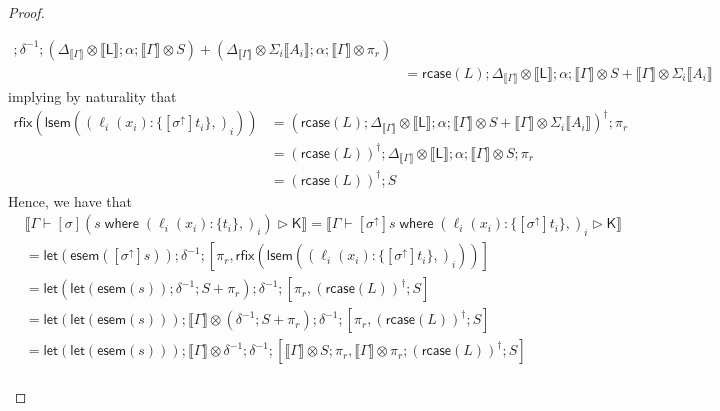 \documentclass[acmsmall,screen,review]{acmart}
\newcommand{\ms}[1]{\ensuremath{\mathsf{#1}}}
\newcommand{\lto}{:}
\newcommand{\where}[2]{#1\;\ms{where}\;#2}
\newcommand{\wbranch}[3]{#1(#2) \lto \{#3\}}
\newcommand{\upg}[1]{{#1}^\uparrow}
\newcommand{\haslb}[3]{#1 \vdash #2 \rhd #3}
\newcommand{\dnt}[1]{\llbracket{#1}\rrbracket}
\newcommand{\dmor}[1]{{\Delta}_{#1}}
\newcommand{\entrymor}[1]{\ms{esem}(#1)}
\newcommand{\loopmor}[1]{\ms{lsem}(#1)}
\newcommand{\lmor}[1]{\ms{let}(#1)}
\newcommand{\rcase}[1]{\ms{rcase}(#1)}
\newcommand{\rfix}[1]{\ms{rfix}(#1)}
\begin{document}
\begin{proof}
\begin{itemize}[leftmargin=*]
\begin{equation}
\begin{aligned}
          ; \delta^{-1}
          ; (\dmor{\dnt{\Gamma}} \otimes \dnt{\ms{L}} ; \alpha ; \dnt{\Gamma} \otimes S) 
          + (\dmor{\dnt{\Gamma}} \otimes \Sigma_i\dnt{A_i}
              ; \alpha ; \dnt{\Gamma} \otimes \pi_r) \\
          & = \rcase{L}
            ; \dmor{\dnt{\Gamma}} \otimes \dnt{\ms{L}} ; \alpha ; \dnt{\Gamma} \otimes S
            + \dnt{\Gamma} \otimes \Sigma_i\dnt{A_i}
      \end{aligned}
    \end{equation}
    implying by naturality that
    \begin{equation}
      \begin{aligned}
        \rfix{\loopmor{(\wbranch{\ell_i}{x_i}{[\upg{\sigma}]t_i},)_i}}
        & = (\rcase{L}
        ; \dmor{\dnt{\Gamma}} \otimes \dnt{\ms{L}} ; \alpha ; \dnt{\Gamma} \otimes S
            + \dnt{\Gamma} \otimes \Sigma_i\dnt{A_i})^\dagger ; \pi_r \\
        & = (\rcase{L})^\dagger 
          ; \dmor{\dnt{\Gamma}} \otimes \dnt{\ms{L}} ; \alpha ; \dnt{\Gamma} \otimes S ; \pi_r \\
        & = (\rcase{L})^\dagger ; S
      \end{aligned}
    \end{equation}
    Hence, we have that
    \begin{equation}
      \begin{aligned}
        & \dnt{\haslb{\Gamma}{[\sigma](\where{s}{(\wbranch{\ell_i}{x_i}{t_i},)_i})}{\ms{K}}}
          = \dnt{\haslb{\Gamma}
                  {\where{[\upg{\sigma}]s}
                  {(\wbranch{\ell_i}{x_i}{[\upg{\sigma}]t_i},)_i}}{\ms{K}}} \\
        & = \lmor{\entrymor{[\upg{\sigma}]s}} ; \delta^{-1} 
          ; [\pi_r , \rfix{\loopmor{(\wbranch{\ell_i}{x_i}{[\upg{\sigma}]t_i},)_i}}] \\
        & = \lmor{\lmor{\entrymor{s}} ; \delta^{-1} ; S + \pi_r}
          ; \delta^{-1}
          ; [\pi_r, (\rcase{L})^\dagger ; S] \\
        & = \lmor{\lmor{\entrymor{s}}} ; \dnt{\Gamma} \otimes (\delta^{-1} ; S + \pi_r)
          ; \delta^{-1}
          ; [\pi_r, (\rcase{L})^\dagger ; S] \\
        & = \lmor{\lmor{\entrymor{s}}} ; \dnt{\Gamma} \otimes \delta^{-1}
          ; \delta^{-1}
          ; [
              \dnt{\Gamma} \otimes S ; \pi_r, 
              \dnt{\Gamma} \otimes \pi_r ; (\rcase{L})^\dagger ; S
            ] \\

\end{aligned}
\end{equation}
\end{itemize}
\end{proof}
\end{document}
